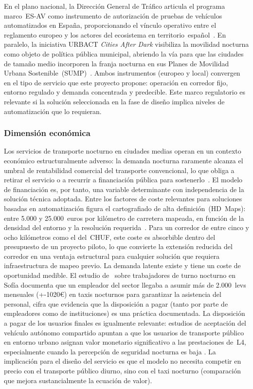 En el plano nacional, la Dirección General de Tráfico articula el
programa marco~ES-AV como instrumento de autorización de pruebas de
vehículos automatizados en España, proporcionando el vínculo operativo
entre el reglamento europeo y los actores del ecosistema en
territorio~español~\parencite{DGTESAV2026}. En paralelo, la iniciativa
URBACT \textit{Cities After Dark} visibiliza la movilidad nocturna como
objeto de política pública municipal, abriendo la vía para que las
ciudades de tamaño medio incorporen la franja nocturna en sus Planes de
Movilidad Urbana Sostenible~(SUMP)~\parencite{URBACT2025Gender}. Ambos
instrumentos (europeo y local) convergen en el tipo de servicio que este
proyecto propone: operación en corredor fijo, entorno regulado y demanda
concentrada y predecible. Este marco regulatorio es relevante si la solución
seleccionada en la fase de diseño implica niveles de automatización que lo requieran.

\subsubsection{Dimensión económica}
\label{sec:pestel-economica}

Los servicios de transporte nocturno en ciudades medias operan en un
contexto económico estructuralmente adverso: la demanda nocturna
raramente alcanza el umbral de rentabilidad comercial del transporte
convencional, lo que obliga a retirar el servicio o a recurrir a
financiación pública para sostenerlo~\parencite{Estrada2021}.
El modelo de financiación es, por tanto, una variable determinante
con independencia de la solución técnica adoptada. Entre los factores
de coste relevantes para soluciones basadas en automatización figura
el cartografiado de alta definición~(HD~Maps): entre 5.000 y
25.000~euros por kilómetro de carretera mapeada, en función de la
densidad del entorno y la resolución requerida~\parencite{AVENUE2023}.
Para un corredor de entre cinco y ocho kilómetros como el del~CHUF,
este coste es absorbible dentro del presupuesto de un proyecto piloto,
lo que convierte la extensión reducida del corredor en una ventaja
estructural para cualquier solución que requiera infraestructura
de mapeo previo.
La demanda latente existe y tiene un coste de oportunidad medible. El
estudio de~\textcite{PlyushetvaBoussauw2020} sobre trabajadores de turno
nocturno en Sofía documenta que un empleador del sector llegaba a asumir
más de 2.000~levs mensuales (+-1020€) en taxis nocturnos para garantizar la
asistencia del personal, cifra que evidencia que la disposición a pagar
(tanto por parte de empleadores como de instituciones) es una práctica documentada. 
La disposición a pagar de los usuarios
finales es igualmente relevante: estudios de aceptación del vehículo
autónomo compartido apuntan a que los usuarios de transporte público en
entorno urbano asignan valor monetario significativo a las prestaciones
de~L4, especialmente cuando la percepción de seguridad nocturna es baja
\parencite{Gavanas2024}. La implicación para el diseño del servicio es que
el modelo no necesita competir en precio con el transporte público diurno,
sino con el taxi nocturno (comparación que mejora sustancialmente la
ecuación de valor).

